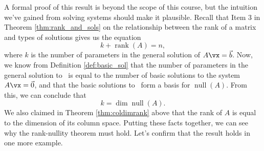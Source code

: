 A formal proof of this result is beyond the scope of this course, but the intuition we've gained from solving systems should make it plausible. Recall that Item 3 in Theorem \ref{thm:rank_and_sols} on the relationship between the rank of a matrix and types of solutions gives us the equation
\[
 k + \operatorname{rank}(A) = n,
\]
where $k$ is the number of parameters in the general solution of $A\vx = \vec b$. Now, we know from Definition \ref{def:basic_sol} that the number of parameters in the general solution to \ttaxb\ is equal to the number of basic solutions to the system $A\vx = \vec 0$, and that the basic solutions to \ttaxo\ form a basis for $\operatorname{null}(A)$. From this, we can conclude that
\[
k = \dim \operatorname{null}(A).
\]
We also claimed in Theorem \ref{thm:coldimrank} above that the rank of $A$ is equal to the dimension of its column space. Putting these facts together, we can see why the rank-nullity theorem must hold. Let's confirm that the result holds in one more example.

